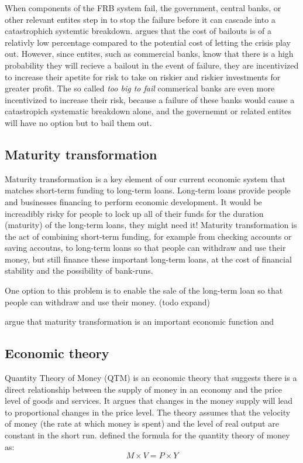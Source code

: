 When components of the FRB system fail, the government, central banks, or other relevant entites step in to stop the failure before it can cascade into a catastrophich systemtic breakdown. \textcite{berger2020tarp} argues that the cost of bailouts is of a relativly low percentage compared to the potential cost of letting the crisis play out. However, since entites, such as commercial banks, know that there is a high probability they will recieve a bailout in the event of failure, they are incentivized to increase their apetite for risk to take on riskier and riskier investments for greater profit. The so called \textit{too big to fail} commerical banks are even more incentivized to increase their risk, because a failure of these banks would cause a catastropich systematic breakdown alone, and the governemnt or related entites will have no option but to bail them out.

\subsection{Maturity transformation}
Maturity transformation is a key element of our current economic system that matches short-term funding to long-term loans. Long-term loans provide people and businesses financing to perform economic development. It would be increadibly risky for people to lock up all of their funds for the duration (maturity) of the long-term loans, they might need it! Maturity transformation is the act of combining short-term funding, for example from checking accounts or saving accoutns, to long-term loans so that people can withdraw and use their money, but still finance these important long-term loans, at the cost of financial stability and the possibility of bank-runs. 

One option to this problem is to enable the sale of the long-term loan so that people can withdraw and use their money. (todo expand)


\textcite{Stellinga2021} argue that maturity transformation is an important economic function and 

\subsection{Economic theory}
Quantity Theory of Money (QTM) is an economic theory that suggests there is a direct relationship between the supply of money in an economy and the price level of goods and services. It argues that changes in the money supply will lead to proportional changes in the price level. The theory assumes that the velocity of money (the rate at which money is spent) and the level of real output are constant in the short run. \textcite{fisherQTM} defined the formula for the quantity theory of money as:
\begin{equation}
    M \times V = P \times Y
\end{equation}

